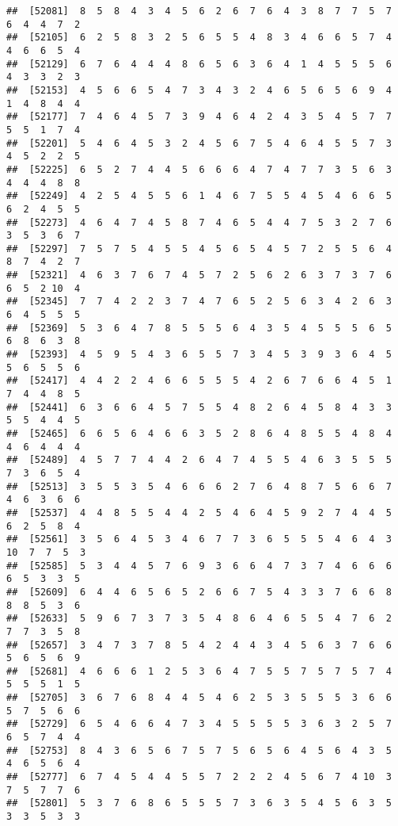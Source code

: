 \documentclass[
]{book}
\begin{document}
\begin{verbatim}
##  [52081]  8  5  8  4  3  4  5  6  2  6  7  6  4  3  8  7  7  5  7  6  4  4  7  2
##  [52105]  6  2  5  8  3  2  5  6  5  5  4  8  3  4  6  6  5  7  4  4  6  6  5  4
##  [52129]  6  7  6  4  4  4  8  6  5  6  3  6  4  1  4  5  5  5  6  4  3  3  2  3
##  [52153]  4  5  6  6  5  4  7  3  4  3  2  4  6  5  6  5  6  9  4  1  4  8  4  4
##  [52177]  7  4  6  4  5  7  3  9  4  6  4  2  4  3  5  4  5  7  7  5  5  1  7  4
##  [52201]  5  4  6  4  5  3  2  4  5  6  7  5  4  6  4  5  5  7  3  4  5  2  2  5
##  [52225]  6  5  2  7  4  4  5  6  6  6  4  7  4  7  7  3  5  6  3  4  4  4  8  8
##  [52249]  4  2  5  4  5  5  6  1  4  6  7  5  5  4  5  4  6  6  5  6  2  4  5  5
##  [52273]  4  6  4  7  4  5  8  7  4  6  5  4  4  7  5  3  2  7  6  3  5  3  6  7
##  [52297]  7  5  7  5  4  5  5  4  5  6  5  4  5  7  2  5  5  6  4  8  7  4  2  7
##  [52321]  4  6  3  7  6  7  4  5  7  2  5  6  2  6  3  7  3  7  6  6  5  2 10  4
##  [52345]  7  7  4  2  2  3  7  4  7  6  5  2  5  6  3  4  2  6  3  6  4  5  5  5
##  [52369]  5  3  6  4  7  8  5  5  5  6  4  3  5  4  5  5  5  6  5  6  8  6  3  8
##  [52393]  4  5  9  5  4  3  6  5  5  7  3  4  5  3  9  3  6  4  5  5  6  5  5  6
##  [52417]  4  4  2  2  4  6  6  5  5  5  4  2  6  7  6  6  4  5  1  7  4  4  8  5
##  [52441]  6  3  6  6  4  5  7  5  5  4  8  2  6  4  5  8  4  3  3  5  5  4  4  5
##  [52465]  6  6  5  6  4  6  6  3  5  2  8  6  4  8  5  5  4  8  4  4  6  4  4  4
##  [52489]  4  5  7  7  4  4  2  6  4  7  4  5  5  4  6  3  5  5  5  7  3  6  5  4
##  [52513]  3  5  5  3  5  4  6  6  6  2  7  6  4  8  7  5  6  6  7  4  6  3  6  6
##  [52537]  4  4  8  5  5  4  4  2  5  4  6  4  5  9  2  7  4  4  5  6  2  5  8  4
##  [52561]  3  5  6  4  5  3  4  6  7  7  3  6  5  5  5  4  6  4  3 10  7  7  5  3
##  [52585]  5  3  4  4  5  7  6  9  3  6  6  4  7  3  7  4  6  6  6  6  5  3  3  5
##  [52609]  6  4  4  6  5  6  5  2  6  6  7  5  4  3  3  7  6  6  8  8  8  5  3  6
##  [52633]  5  9  6  7  3  7  3  5  4  8  6  4  6  5  5  4  7  6  2  7  7  3  5  8
##  [52657]  3  4  7  3  7  8  5  4  2  4  4  3  4  5  6  3  7  6  6  5  6  5  6  9
##  [52681]  4  6  6  6  1  2  5  3  6  4  7  5  5  7  5  7  5  7  4  5  5  5  1  5
##  [52705]  3  6  7  6  8  4  4  5  4  6  2  5  3  5  5  5  3  6  6  5  7  5  6  6
##  [52729]  6  5  4  6  6  4  7  3  4  5  5  5  5  3  6  3  2  5  7  6  5  7  4  4
##  [52753]  8  4  3  6  5  6  7  5  7  5  6  5  6  4  5  6  4  3  5  4  6  5  6  4
##  [52777]  6  7  4  5  4  4  5  5  7  2  2  2  4  5  6  7  4 10  3  7  5  7  7  6
##  [52801]  5  3  7  6  8  6  5  5  5  7  3  6  3  5  4  5  6  3  5  3  3  5  3  3

\end{verbatim}
\end{document}

